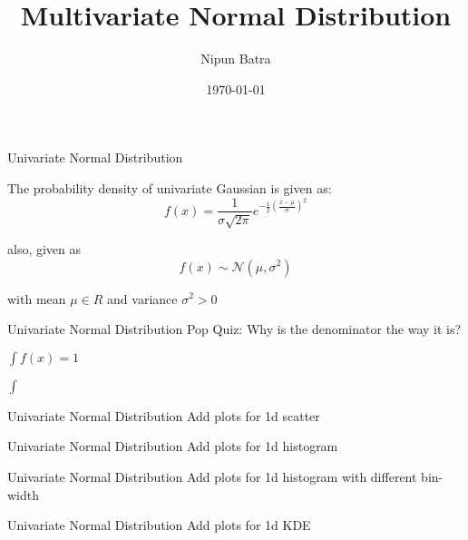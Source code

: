 \documentclass{beamer}
\title{Multivariate Normal Distribution}
\date{\today}
\author{Nipun Batra}
\institute{IIT Gandhinagar}
\begin{document}
  \maketitle
  
  


\begin{frame}{Univariate Normal Distribution}

The probability density of univariate Gaussian is given as: $$f(x) = \frac{1}{\sigma \sqrt{2\pi} } e^{-\frac{1}{2}\left(\frac{x-\mu}{\sigma}\right)^2}$$
	
also, given as 
$$f(x)\sim \mathcal{N}(\mu, \sigma^2)$$

with mean $\mu \in R$ and variance $\sigma^2 >0$ 

\end{frame}

\begin{frame}{Univariate Normal Distribution}
Pop Quiz: Why is the denominator the way it is? 

$\int f(x) = 1$

$\int $
\end{frame}

\begin{frame}{Univariate Normal Distribution}
Add plots for 1d scatter 
\end{frame}

\begin{frame}{Univariate Normal Distribution}
Add plots for 1d histogram
\end{frame}

\begin{frame}{Univariate Normal Distribution}
Add plots for 1d histogram with different bin-width
\end{frame}

\begin{frame}{Univariate Normal Distribution}
Add plots for 1d KDE
\end{frame}
\end{document}
